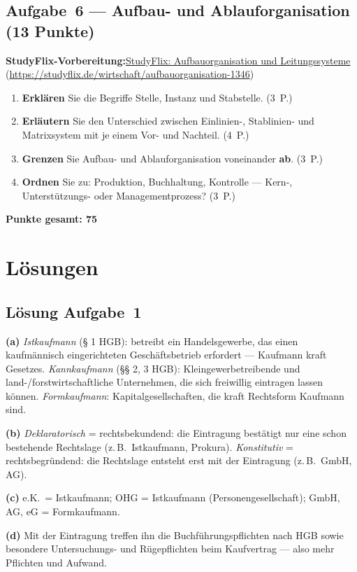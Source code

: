 \documentclass[11pt, a4paper]{article}
\begin{document}
\subsection*{Aufgabe~6 --- Aufbau- und Ablauforganisation (13 Punkte)}

\noindent\textbf{\color{bfwAccent}StudyFlix-Vorbereitung:}\enspace \href{https://studyflix.de/wirtschaft/aufbauorganisation-1346}{StudyFlix: Aufbauorganisation und Leitungssysteme} (\url{https://studyflix.de/wirtschaft/aufbauorganisation-1346})

\medskip
\begin{enumerate}[label=(\alph*)]
  \item \textbf{Erklären} Sie die Begriffe Stelle, Instanz und Stabstelle. \hfill (3~P.)
  \item \textbf{Erläutern} Sie den Unterschied zwischen Einlinien-, Stablinien- und Matrixsystem mit je einem Vor- und Nachteil. \hfill (4~P.)
  \item \textbf{Grenzen} Sie Aufbau- und Ablauforganisation voneinander \textbf{ab}. \hfill (3~P.)
  \item \textbf{Ordnen} Sie zu: Produktion, Buchhaltung, Kontrolle --- Kern-, Unterstützungs- oder Managementprozess? \hfill (3~P.)
\end{enumerate}

\vspace{1em}
\noindent\textbf{Punkte gesamt: 75}

\newpage

\section{Lösungen}\label{loesungen}

\subsection*{Lösung Aufgabe~1}
\begin{loesung}
\textbf{(a)} \emph{Istkaufmann} (§ 1 HGB): betreibt ein Handelsgewerbe, das einen
kaufmännisch eingerichteten Geschäftsbetrieb erfordert --- Kaufmann kraft Gesetzes.
\emph{Kannkaufmann} (§§ 2, 3 HGB): Kleingewerbetreibende und land-/forstwirtschaftliche
Unternehmen, die sich freiwillig eintragen lassen können. \emph{Formkaufmann}:
Kapitalgesellschaften, die kraft Rechtsform Kaufmann sind.

\textbf{(b)} \emph{Deklaratorisch} = rechtsbekundend: die Eintragung bestätigt nur eine
schon bestehende Rechtslage (z.\,B.\ Istkaufmann, Prokura). \emph{Konstitutiv} =
rechtsbegründend: die Rechtslage entsteht erst mit der Eintragung (z.\,B.\ GmbH, AG).

\textbf{(c)} e.K.\ = Istkaufmann; OHG = Istkaufmann (Personengesellschaft); GmbH, AG, eG
= Formkaufmann.

\textbf{(d)} Mit der Eintragung treffen ihn die Buchführungspflichten nach HGB sowie
besondere Untersuchungs- und Rügepflichten beim Kaufvertrag --- also mehr Pflichten und
Aufwand.
\end{loesung}
\end{document}
